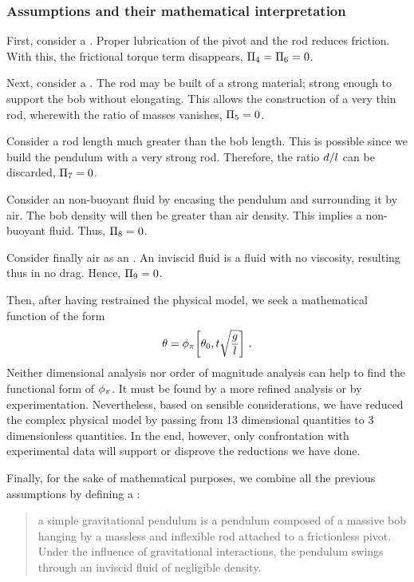 \subsubsection{Assumptions and their mathematical interpretation}\label{subsec:mathinterpretation}
First, consider a . Proper lubrication of the pivot and the rod reduces friction. With this, the frictional torque term disappears, $\Pi_4 = \Pi_6 = 0$.

Next, consider a . The rod may be built of a strong material; strong enough to support the bob without elongating. This allows the construction of a very thin rod, wherewith the ratio of masses vanishes, $\Pi_5 = 0$.

Consider a rod length much greater than the bob length. This is possible since we build the pendulum with a very strong rod. Therefore, the ratio $d/l$ can be discarded, $\Pi_7 = 0$.

Consider an non-buoyant fluid by encasing the pendulum and surrounding it by air. The bob density will then be greater than air density. This implies a non-buoyant fluid. Thus, $\Pi_8 = 0$.

Consider finally air as an . An inviscid fluid is a fluid with no viscosity, resulting thus in no drag. Hence, $\Pi_9 = 0$.

Then, after having restrained the physical model, we seek a mathematical function of the form
\begin{equation}\label{eq:simplegravpendulumdimanalysis}
\theta = \phi_{\pi}\!\left[{
            \theta_0, 
            t\sqrt{\dfrac{g}{l}}
            }\right]\,.
\end{equation}
Neither dimensional analysis nor order of magnitude analysis can help to find the functional form of $\phi_{\pi}$. It must be found by a more refined analysis or by experimentation. Nevertheless, based on sensible considerations, we have reduced the complex physical model by passing from 13 dimensional quantities to 3 dimensionless quantities. In the end, however, only confrontation with experimental data will support or disprove the reductions we have done.

Finally, for the sake of mathematical purposes, we combine all the previous assumptions by defining a :
\begin{quote}
a simple gravitational pendulum is a pendulum composed of a massive bob hanging by a massless and inflexible rod attached to a frictionless pivot. Under the influence of gravitational interactions, the pendulum swings through an inviscid fluid of negligible density.
\end{quote}


